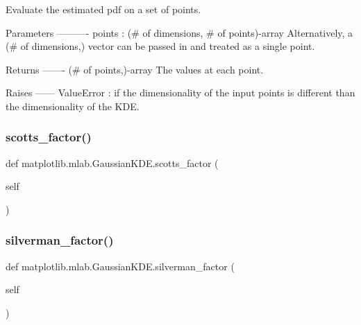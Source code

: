 \begin{DoxyVerb}Evaluate the estimated pdf on a set of points.

Parameters
----------
points : (# of dimensions, # of points)-array
    Alternatively, a (# of dimensions,) vector can be passed in and
    treated as a single point.

Returns
-------
(# of points,)-array
    The values at each point.

Raises
------
ValueError : if the dimensionality of the input points is different
     than the dimensionality of the KDE.\end{DoxyVerb}
 \mbox{\label{classmatplotlib_1_1mlab_1_1GaussianKDE_ac36963e4ffac27c198101dcdd2c9f59a}} 
\subsubsection{\texorpdfstring{scotts\+\_\+factor()}{scotts\_factor()}}
{\footnotesize\ttfamily def matplotlib.\+mlab.\+Gaussian\+K\+D\+E.\+scotts\+\_\+factor (\begin{DoxyParamCaption}\item[{}]{self }\end{DoxyParamCaption})}

\mbox{\label{classmatplotlib_1_1mlab_1_1GaussianKDE_ab7bc555187ab1ca936ab70d8e226e5e2}} 
\subsubsection{\texorpdfstring{silverman\+\_\+factor()}{silverman\_factor()}}
{\footnotesize\ttfamily def matplotlib.\+mlab.\+Gaussian\+K\+D\+E.\+silverman\+\_\+factor (\begin{DoxyParamCaption}\item[{}]{self }\end{DoxyParamCaption})}




